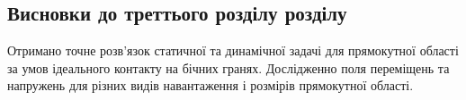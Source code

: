 \subsection{Висновки до треттього розділу розділу}
Отримано точне розв'язок статичної та динамічної задачі для прямокутної області за умов ідеального контакту на бічних гранях.
Дослідженно поля переміщень та напружень для різних видів навантаження і розмірів прямокутної області.